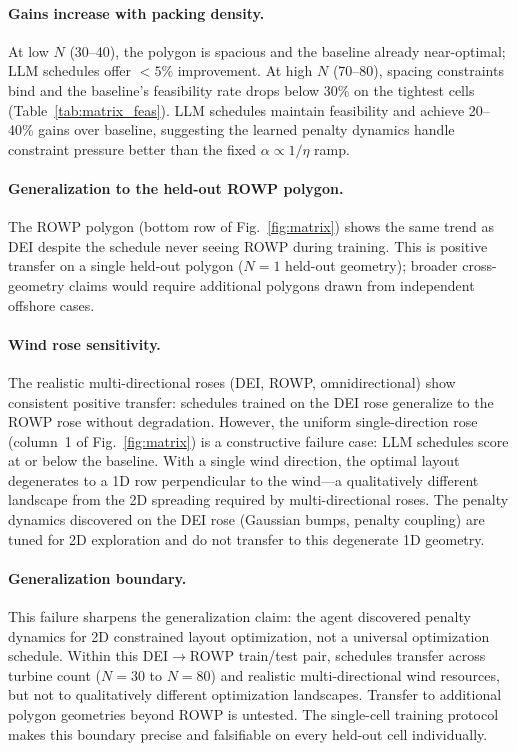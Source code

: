 \paragraph{Gains increase with packing density.}
At low $N$ (30--40), the polygon is spacious and the baseline
already near-optimal; LLM schedules offer $<\!5\%$ improvement.
At high $N$ (70--80), spacing constraints bind and the baseline's
feasibility rate drops below 30\% on the tightest cells
(Table~\ref{tab:matrix_feas}).  LLM schedules maintain feasibility
and achieve 20--40\% gains over baseline, suggesting the learned
penalty dynamics handle constraint pressure better than the fixed
$\alpha \propto 1/\eta$ ramp.

\paragraph{Generalization to the held-out ROWP polygon.}
The ROWP polygon (bottom row of Fig.~\ref{fig:matrix}) shows the
same trend as DEI despite the schedule never seeing ROWP during
training. This is positive transfer on a single held-out polygon
($N=1$ held-out geometry); broader cross-geometry claims would
require additional polygons drawn from independent offshore cases.

\paragraph{Wind rose sensitivity.}
The realistic multi-directional roses (DEI, ROWP, omnidirectional)
show consistent positive transfer: schedules trained on the DEI
rose generalize to the ROWP rose without degradation.  However,
the uniform single-direction rose (column~1 of Fig.~\ref{fig:matrix})
is a constructive failure case: LLM schedules score at or below the
baseline.  With a single wind direction, the optimal layout
degenerates to a 1D row perpendicular to the wind---a qualitatively
different landscape from the 2D spreading required by
multi-directional roses.  The penalty dynamics discovered on the
DEI rose (Gaussian bumps, penalty coupling) are tuned for 2D
exploration and do not transfer to this degenerate 1D geometry.

\paragraph{Generalization boundary.}
This failure sharpens the generalization claim: the agent
discovered penalty dynamics for 2D constrained layout
optimization, not a universal optimization schedule. Within this
DEI$\to$ROWP train/test pair, schedules transfer across turbine
count ($N\!=\!30$ to $N\!=\!80$) and realistic multi-directional
wind resources, but not to qualitatively different optimization
landscapes. Transfer to additional polygon geometries beyond ROWP
is untested. The single-cell training protocol makes this
boundary precise and falsifiable on every held-out cell
individually.

